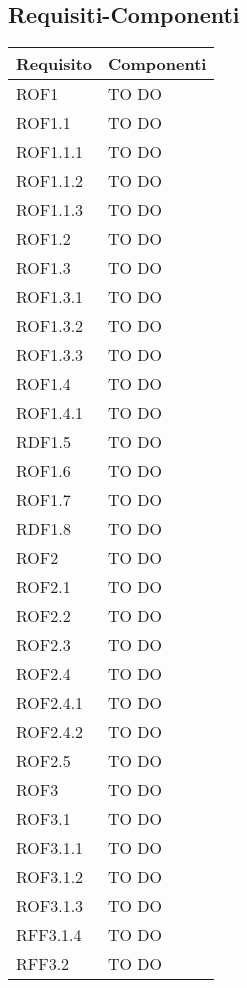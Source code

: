 \subsection{Requisiti-Componenti} %
\label{sub:componenti_requisiti}
\begin{center}
\def\arraystretch{1.5}
\bgroup
\begin{longtable}{| p{4cm} | p{8cm} |}
\hline
\textbf{Requisito} & \textbf{Componenti} \\
\hline
ROF1   &  TO DO \\
\hline
ROF1.1   &  TO DO \\
\hline
ROF1.1.1   &  TO DO \\
\hline
ROF1.1.2   &  TO DO \\
\hline
ROF1.1.3   &  TO DO \\
\hline
ROF1.2   &  TO DO \\
\hline
ROF1.3   &  TO DO \\
\hline
ROF1.3.1   &  TO DO \\
\hline
ROF1.3.2   &  TO DO \\
\hline
ROF1.3.3   &  TO DO \\
\hline
ROF1.4   &  TO DO \\
\hline
ROF1.4.1   &  TO DO \\
\hline
RDF1.5   &  TO DO \\
\hline
ROF1.6   &  TO DO \\
\hline
ROF1.7   &  TO DO \\
\hline
RDF1.8   &  TO DO \\
\hline
ROF2   &  TO DO \\
\hline
ROF2.1   &  TO DO \\
\hline
ROF2.2   &  TO DO \\
\hline
ROF2.3   &  TO DO \\
\hline
ROF2.4   &  TO DO \\
\hline
ROF2.4.1   &  TO DO \\
\hline
ROF2.4.2   &  TO DO \\
\hline
ROF2.5   &  TO DO \\
\hline
ROF3   &  TO DO \\
\hline
ROF3.1   &  TO DO \\
\hline
ROF3.1.1   &  TO DO \\
\hline
ROF3.1.2   &  TO DO \\
\hline
ROF3.1.3   &  TO DO \\
\hline
RFF3.1.4   &  TO DO \\
\hline
RFF3.2   &  TO DO \\

\end{longtable}
\end{center}
